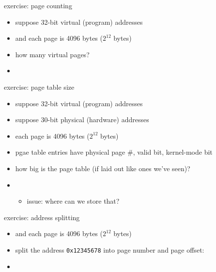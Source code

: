 \begin{frame}{exercise: page counting}
    \begin{itemize}
        \item suppose 32-bit virtual (program) addresses
        \item and each page is 4096 bytes ($2^{12}$ bytes)
            \vspace{.5cm}
        \item how many virtual pages?
        \item<2-> \iftoggle{heldback}{}{$2^{32} / 2^{12} = 2^{20}$}
    \end{itemize}
\end{frame}

\begin{frame}{exercise: page table size}
    \begin{itemize}
        \item suppose 32-bit virtual (program) addresses
        \item suppose 30-bit physical (hardware) addresses
        \item each page is 4096 bytes ($2^{12}$ bytes)
        \item pgae table entries have physical page \#, valid bit, kernel-mode bit
            \vspace{.5cm}
        \item how big is the page table (if laid out like ones we've seen)? 
        \item<2-> \iftoggle{heldback}{}{$2^{20}$ entries $\times (18 + 2)$ bits per entry}
            \begin{itemize}
            \item issue: where can we store that?
            \end{itemize}
    \end{itemize}
\end{frame}

\begin{frame}{exercise: address splitting}
    \begin{itemize}
    \item and each page is 4096 bytes ($2^{12}$ bytes)
    \item split the address {\tt 0x12345678} into page number and page offset:
    \item<2-> \iftoggle{heldback}{}{page \#: {\tt0x12345}; offset: {\tt 0x678}}
    \end{itemize}
\end{frame}

